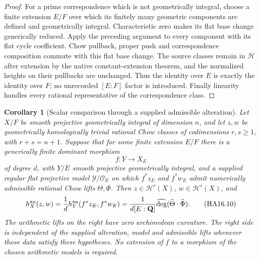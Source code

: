 \documentclass[11pt,a4paper]{article}
\newtheorem{corollary}[theorem]{Corollary}
\theoremstyle{definition}
\theoremstyle{remark}
\numberwithin{equation}{section}
\begin{document}
\begin{proof}
For a prime correspondence which is not geometrically integral,
choose a finite extension $E/F$ over which its finitely many
geometric components are defined and geometrically integral.
Characteristic zero makes its flat base change generically
reduced. Apply the preceding argument to every component with
its flat cycle coefficient. Chow pullback, proper push and
correspondence composition commute with this flat base change.
The source classes remain in $\mathcal H$ after extension by
the native constant-extension theorem, and the normalized
heights on their pullbacks are unchanged. Thus the identity
over $E$ is exactly the identity over $F$; no unrecorded
$[E:F]$ factor is introduced. Finally linearity handles every
rational representative of the correspondence class.
\end{proof}

\begin{corollary}[Scalar comparison through a supplied admissible alteration]
\label{r16ha:alteration-comparison}
Let $X/F$ be smooth projective geometrically integral of dimension
$n$, and let $z,w$ be geometrically homologically trivial rational
Chow classes of codimensions $r,s\geq1$, with $r+s=n+1$.
Suppose that for some finite extension $E/F$ there is a
generically finite dominant morphism
\[
                      f:Y\longrightarrow X_E
\]
of degree $d$, with $Y/E$ smooth projective geometrically integral,
and a supplied regular flat projective model
$\mathcal Y/\mathcal O_E$ on which $f^*z_E$ and $f^*w_E$
admit numerically admissible rational Chow lifts $\Theta,\Phi$.
Then $z\in\mathcal H^r(X)$, $w\in\mathcal H^s(X)$, and
\[
 h_X^{\rm an}(z,w)
       =\frac1d h_Y^{\rm an}(f^*z_E,f^*w_E)
       =\frac1{d[E:\mathbf Q]}
                     \widehat{\deg}(\widehat\Theta\cdot\widehat\Phi).
 \tag{HA16.10}\label{r16ha:alteration-height}
\]
The arithmetic lifts on the right have zero archimedean curvature.
The right side is independent of the supplied alteration, model
and admissible lifts whenever those data satisfy these hypotheses.
No extension of $f$ to a morphism of the chosen arithmetic models
is required.
\end{corollary}
\end{document}
